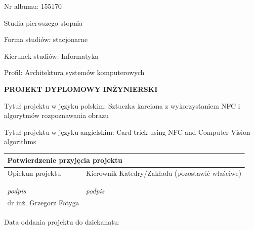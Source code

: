\documentclass{article}
\numberwithin{equation}{section}
\begin{document}
\begin{mainPage}
\begin{multicols}{2}
\begin{flushleft}
Nr albumu: 155170

Studia pierwszego stopnia

Forma studiów: stacjonarne

Kierunek studiów: Informatyka

Profil: Architektura systemów komputerowych
\end{flushleft}
\end{multicols}

\vspace*{10mm}
\begin{center}
    \large{
\textbf{PROJEKT DYPLOMOWY INŻYNIERSKI}}
\end{center}
\vspace*{10mm}
\begin{flushleft}
Tytuł projektu w języku polskim: Sztuczka karciana z wykorzystaniem NFC i algorytmów rozpoznawania obrazu

Tytuł projektu w języku angielskim: Card trick using NFC and Computer Vision algorithms
\end{flushleft}
\vspace*{10mm}
\begin{center}
\begin{tabular}{|l|l|} \hline
\multicolumn{2}{|l|}{Potwierdzenie przyjęcia projektu}\\
\hline
Opiekun projektu & Kierownik Katedry/Zakładu (pozostawić właściwe) \\ & \\ & \\
\small{\textit{podpis}} & \small{\textit{podpis}}\\
\hline
dr inż. Grzegorz Fotyga & \\
\hline 
\end{tabular}
\end{center}

\vspace*{5mm}
\begin{flushleft}
Data oddania projektu do dziekanatu:
\end{flushleft}
\end{mainPage}

\end{document}

